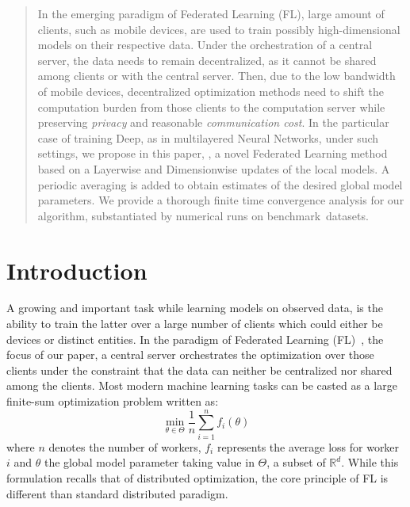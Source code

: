 \documentclass{article}
\begin{document}
\begin{abstract}\vspace{-0.1in}
In the emerging paradigm of Federated Learning (FL), large amount of clients, such as mobile devices, are used to train possibly high-dimensional models on their respective data.
Under the orchestration of a central server, the data needs to remain decentralized, as it cannot be shared among clients or with the central server.
Then, due to the low bandwidth of mobile devices, decentralized optimization methods need to shift the computation burden from those clients to the computation server while preserving \emph{privacy} and reasonable \emph{communication cost}.
In the particular case of training Deep, as in multilayered Neural Networks, under such settings, we propose in this paper, \algo, a novel Federated Learning method based on a Layerwise and Dimensionwise updates of the local models. 
A periodic averaging is added to obtain estimates of the desired global model parameters.
We provide a thorough finite time convergence analysis for our algorithm, substantiated by numerical runs on benchmark~datasets.
\end{abstract}

\vspace{-0.2in}
\section{Introduction}\label{sec:introduction}

A growing and important task while learning models on observed data, is the ability to train the latter over a large number of clients which could either be devices or distinct entities.
In the paradigm of Federated Learning (FL)~\citep{konevcny2016federated,mcmahan2017communication}, the focus of our paper, a central server orchestrates the optimization over those clients under the constraint that the data can neither be centralized nor shared among the clients.
Most modern machine learning tasks can be casted as a large finite-sum optimization problem written as:
\begin{equation}\label{eq:opt}
\min \limits_{\theta \in \Theta} \frac{1}{n} \sum_{i=1}^n f_i(\theta)
\end{equation}
where $n$ denotes the number of workers, $f_i$ represents the average loss for worker $i$ and $\theta$ the global model parameter taking value in $\Theta$, a subset of $\mathbb{R}^d$.
While this formulation recalls that of distributed optimization, the core principle of FL is different than standard distributed paradigm.
\end{document}
